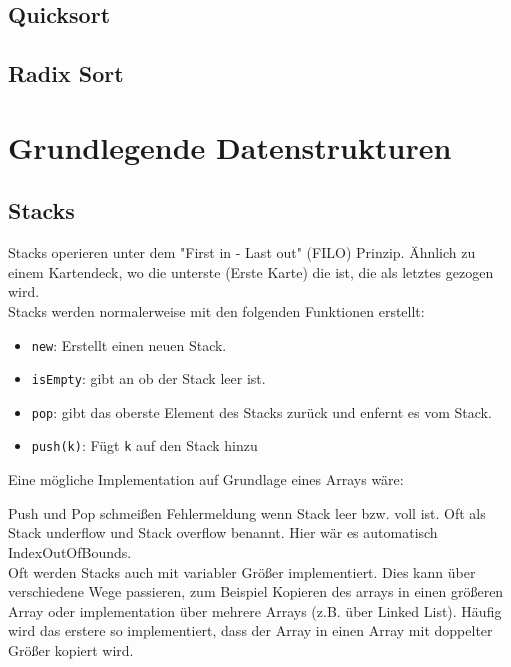 \documentclass[ngerman,
color=3b,
load_common, %
boxarc,
main,
tikz,
border=3mm
]{article}
\begin{document}


\newpage
\subsection{Quicksort}



\newpage
\subsection{Radix Sort}



\newpage
\section{Grundlegende Datenstrukturen}
\subsection{Stacks}
Stacks operieren unter dem "First in - Last out" (FILO) Prinzip. Ähnlich zu einem Kartendeck, wo die unterste (Erste Karte) die ist, die als letztes gezogen wird. \\
Stacks werden normalerweise mit den folgenden Funktionen erstellt:
\begin{itemize}
    \item \texttt{new}: Erstellt einen neuen Stack.
    \item \texttt{isEmpty}: gibt an ob der Stack leer ist.
    \item \texttt{pop}: gibt das oberste Element des Stacks zurück und enfernt es vom Stack.
    \item \texttt{push(k)}: Fügt \texttt{k} auf den Stack hinzu
\end{itemize}
Eine mögliche Implementation auf Grundlage eines Arrays wäre:
\begin{algorithm}
    \DontPrintSemicolon

\end{algorithm}
Push und Pop schmeißen Fehlermeldung wenn Stack leer bzw. voll ist. Oft als Stack underflow und Stack overflow benannt. Hier wär es automatisch IndexOutOfBounds.\\ Oft werden Stacks auch mit variabler Größer implementiert. Dies kann über verschiedene Wege passieren, zum Beispiel Kopieren des arrays in einen größeren Array oder implementation über mehrere Arrays (z.B. über Linked List). Häufig wird das erstere so implementiert, dass der Array in einen Array mit doppelter Größer kopiert wird.
\end{document}
